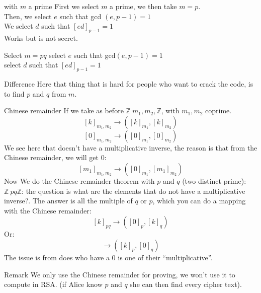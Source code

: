 
\begin{parag}{with $m$ a prime}
    First we select $m$ a prime, we then take $m = p$.\\
    Then, we select $e$ such that gcd $\left(e, p-1\right) = 1$\\
    We select $d$ such that $\left[ed\right]_{p-1} = 1$\\
    Works but is not secret.
\end{parag}

\begin{parag}{Select $m = pq$}
    select $e$ such that gcd$\left(e, p-1\right) = 1$\\
    select $d$ such that $\left[ed\right]_{p-1} = 1$
\end{parag}


\begin{parag}{Difference}
    Here that thing that is hard for people who want to crack the code, is to find $p$ and $q$ from $m$.
\end{parag}
\begin{parag}{Chinese remainder}
    If we take as before  $\mathbb{Z} \ m_1, m_2, \mathbb{Z}$, with $m_1, m_2$ coprime.
    \begin{equation*} \left[k\right]_{m_1, m_2} \to \left(\left[k\right]_{m_1}, \left[k\right]_{m_2}\right) \end{equation*}
    \begin{equation*} \left[0\right]_{m_1, m_2} \to \left(\left[0\right]_{m_1}, \left[0\right]_{m_2}\right) \end{equation*}
    We see here that  doesn't have a multiplicative inverse, the reason is that from the Chinese remainder, we will get $0$:
    \begin{equation*} \left[m_1\right]_{m_1, m_2} \to \left(\left[0\right]_{m_1}, \left[m_1\right]_{m_2}\right) \end{equation*}
    Now We do the Chinese remainder theorem with $p$ and $q$ (two distinct prime): $\mathbb{Z} \ pq \mathbb{Z}$: the question is what are  the elements that do not have a multiplicative inverse?. The answer is all the multiple of $q$ or $p$, which you can do a mapping with the Chinese remainder:
    \begin{equation*} \left[k\right]_{pq} \to \left(\left[0\right]_p, \left[k\right]_q \right)\end{equation*}
    Or:
    \begin{equation*} \to \left(\left[k\right]_p, \left[0\right]_q\right) \end{equation*}
   The issue is from does who have a $0$ is one of their ``multiplicative''. 
   \begin{subparag}{Remark}
       We only use the Chinese remainder  for proving, we won't use it to compute in RSA. (if Alice know $p$ and $q$ she can then find every cipher text).
   \end{subparag}
\end{parag}

